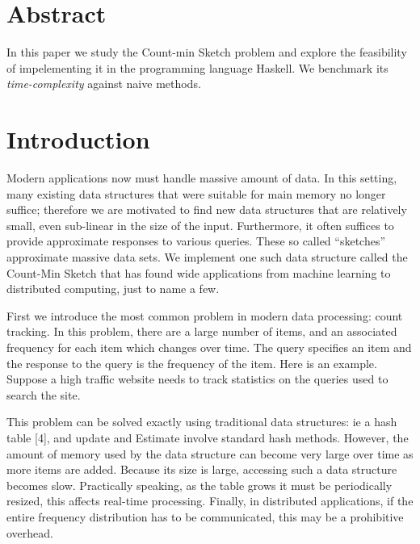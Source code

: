 


\section*{Abstract}

In this paper we study the Count-min Sketch problem and explore the feasibility of impelementing it in the programming language Haskell. We benchmark its \textit{time-complexity} against naive methods.\newline


\section*{Introduction}

Modern applications now must handle massive amount of data. In this setting, many existing data structures that were suitable for main memory no longer suffice; therefore we are motivated to find new  data structures that are relatively small, even sub-linear in the size of the input. Furthermore, it often suffices to provide approximate responses to various queries. 
These so called “sketches”  approximate massive data sets. We implement one such data structure called the Count-Min Sketch that has found wide applications from machine learning to distributed computing, just to name a few. \newline

First we introduce the most common problem in modern data processing: count tracking. In this problem, there are a large number of items, and an associated frequency for each item which changes over time. The query specifies an
item and the response to the query is the frequency of the item. Here is an example.
Suppose a high traffic website needs to track statistics on the queries used
to search the site. \newline

This problem can be solved exactly using traditional data structures: ie a hash table [4], and update and Estimate involve standard hash methods. However, the amount of memory used by the data structure can become very large over
time as more items are added. Because its size is large, accessing such a data structure becomes slow. Practically speaking, as the table grows it must be periodically resized, this affects real-time processing. Finally, in
distributed applications, if the entire frequency distribution has to be communicated, this may be a prohibitive overhead. \newline

